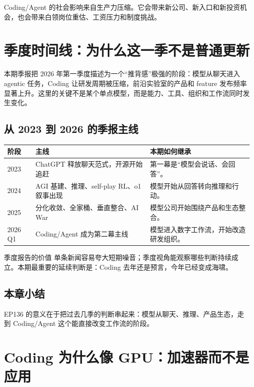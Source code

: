\documentclass[a4paper]{article}
\begin{document}
Coding/Agent 的社会影响来自生产力压缩。它会带来新公司、新入口和新投资机会，也会带来白领岗位重估、工资压力和制度挑战。


\section{季度时间线：为什么这一季不是普通更新}

本期季报把 2026 年第一季度描述为一个“推背感”极强的阶段：模型从聊天进入 agentic 任务，Coding 让研发周期被压缩，前沿实验室的产品和 feature 发布频率显著上升。这里的关键不是某个单点模型，而是能力、工具、组织和工作流同时发生变化。

\subsection{从 2023 到 2026 的季报主线}

\noindent\begin{longtable}{p{}p{}p{}}
\toprule
阶段 & 主线 & 本期如何继承 \\
\midrule
2023 & ChatGPT 释放聊天范式，开源开始追赶 & 第一幕是“模型会说话、会回答”。 \\
2024 & AGI 基建、推理、self-play RL、o1 叙事出现 & 模型开始从回答转向推理和行动。 \\
2025 & 分化收敛、全家桶、垂直整合、AI War & 模型公司开始围绕产品和生态整合。 \\
2026 Q1 & Coding/Agent 成为第二幕主线 & 模型进入数字工作流，开始改造研发组织。 \\
\bottomrule
\end{longtable}

\begin{importantbox}{季度报告的价值}
单条新闻容易夸大短期噪音；季度视角能观察哪些判断持续成立。本期最重要的延续判断是：Coding 去年还是预言，今年已经变成海啸。
\end{importantbox}

\subsection{本章小结}

EP136 的意义在于把过去几季的判断串起来：模型从聊天、推理、产品生态，走到 Coding/Agent 这个能直接改变工作流的阶段。

\section{Coding 为什么像 GPU：加速器而不是应用}
\end{document}
